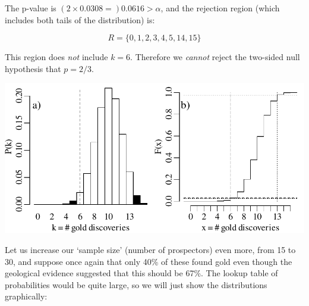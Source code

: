 The p-value is $(2\times{0.0308}=) 0.0616>\alpha$, and the rejection
region (which includes both tails of the distribution) is:

\begin{equation}
  R=\{0,1,2,3,4,5,14,15\}
  \label{eq:2sidedbinomtest15}
\end{equation}

This region does \emph{not} include $k=6$. Therefore we \emph{cannot}
reject the two-sided null hypothesis that $p=2/3$.\\

\noindent\begin{minipage}[t][][b]{.6\textwidth}
  \includegraphics[width=\textwidth]{../figures/2sidedbinomialrejection15.pdf}\\
\end{minipage}
\begin{minipage}[t][][t]{.4\textwidth}
  \label{fig:2sidedbinomialrejection15}
\end{minipage}

Let us increase our `sample size' (number of prospectors) even more,
from 15 to 30, and suppose once again that only 40\% of these found
gold even though the geological evidence suggested that this should be
67\%. The lookup table of probabilities would be quite large, so we
will just show the distributions graphically:\\

